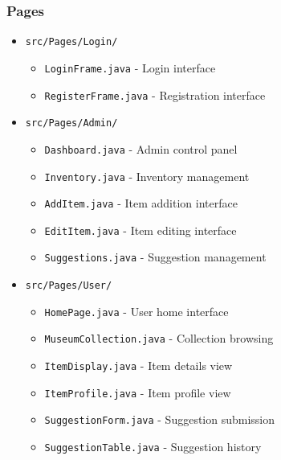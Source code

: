 \documentclass[12pt,a4paper]{article}
\begin{document}
\subsubsection{Pages}
\begin{itemize}
    \item \texttt{src/Pages/Login/}
    \begin{itemize}
        \item \texttt{LoginFrame.java} - Login interface
        \item \texttt{RegisterFrame.java} - Registration interface
    \end{itemize}
    
    \item \texttt{src/Pages/Admin/}
    \begin{itemize}
        \item \texttt{Dashboard.java} - Admin control panel
        \item \texttt{Inventory.java} - Inventory management
        \item \texttt{AddItem.java} - Item addition interface
        \item \texttt{EditItem.java} - Item editing interface
        \item \texttt{Suggestions.java} - Suggestion management
    \end{itemize}
    
    \item \texttt{src/Pages/User/}
    \begin{itemize}
        \item \texttt{HomePage.java} - User home interface
        \item \texttt{MuseumCollection.java} - Collection browsing
        \item \texttt{ItemDisplay.java} - Item details view
        \item \texttt{ItemProfile.java} - Item profile view
        \item \texttt{SuggestionForm.java} - Suggestion submission
        \item \texttt{SuggestionTable.java} - Suggestion history
    \end{itemize}
\end{itemize}
\end{document}
